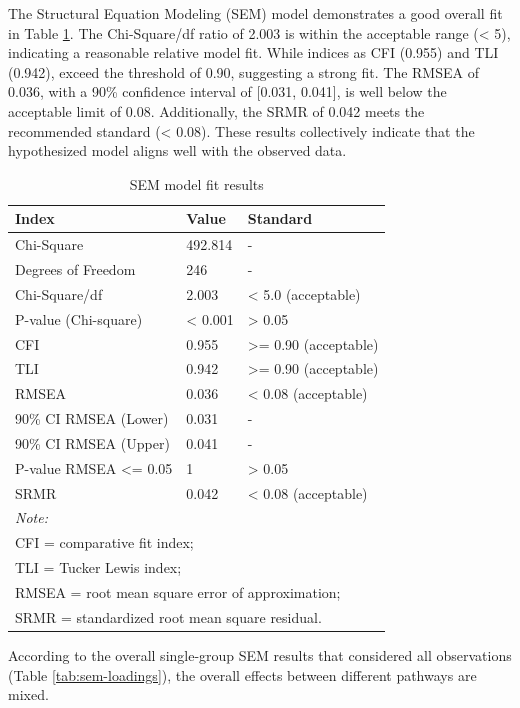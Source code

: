 \documentclass[
11pt, %
oneside, %
english, %
singlespacing, %
]{macthesis} %
\begin{document}
The Structural Equation Modeling (SEM) model demonstrates a good overall fit in Table \ref{tab:sem-model-fit}. The Chi-Square/df ratio of 2.003 is within the acceptable range (\textless{} 5), indicating a reasonable relative model fit. While indices as CFI (0.955) and TLI (0.942), exceed the threshold of 0.90, suggesting a strong fit. The RMSEA of 0.036, with a 90\% confidence interval of {[}0.031, 0.041{]}, is well below the acceptable limit of 0.08. Additionally, the SRMR of 0.042 meets the recommended standard (\textless{} 0.08). These results collectively indicate that the hypothesized model aligns well with the observed data.

\begin{table}

\caption{\label{tab:sem-model-fit}\label{tab:sem-model-fit} SEM model fit results}
\centering
\begin{tabular}[t]{lll}
\toprule
Index & Value & Standard\\
\midrule
Chi-Square & 492.814 & -\\
Degrees of Freedom & 246 & -\\
Chi-Square/df & 2.003 & < 5.0 (acceptable)\\
P-value (Chi-square) & < 0.001 & > 0.05\\
CFI & 0.955 & >= 0.90 (acceptable)\\
\addlinespace
TLI & 0.942 & >= 0.90 (acceptable)\\
RMSEA & 0.036 & < 0.08 (acceptable)\\
90\% CI RMSEA (Lower) & 0.031 & -\\
90\% CI RMSEA (Upper) & 0.041 & -\\
P-value RMSEA <= 0.05 & 1 & > 0.05\\
\addlinespace
SRMR & 0.042 & < 0.08 (acceptable)\\
\bottomrule
\multicolumn{3}{l}{\rule{0pt}{1em}\textit{Note: }}\\
\multicolumn{3}{l}{\rule{0pt}{1em}CFI = comparative ﬁt index;}\\
\multicolumn{3}{l}{\rule{0pt}{1em}TLI = Tucker Lewis index;}\\
\multicolumn{3}{l}{\rule{0pt}{1em}RMSEA = root mean square error of approximation;}\\
\multicolumn{3}{l}{\rule{0pt}{1em}SRMR = standardized root mean square residual.}\\
\end{tabular}
\end{table}

According to the overall single-group SEM results that considered all observations (Table \ref{tab:sem-loadings}), the overall effects between different pathways are mixed.
\end{document}
